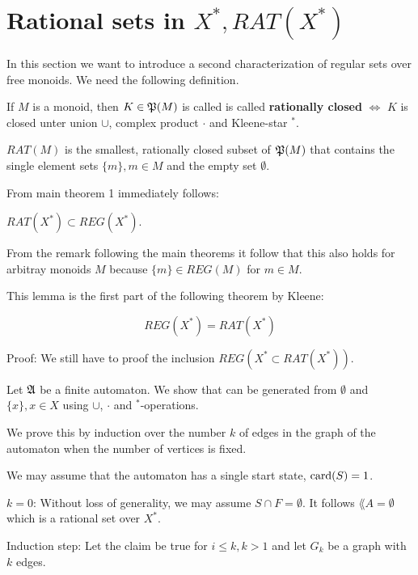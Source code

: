 \section{Rational sets in $X^*, RAT(X^*)$}

In this section we want to introduce a second characterization of regular sets
over free monoids. We need the following definition.

\begin{definition}
If $M$ is a monoid, then $K \in \mathfrak{P}(M)$ is called is called {\bf rationally
closed} $\Leftrightarrow$ $K$ is closed unter union $\cup$, complex product $\cdot$ and Kleene-star $^*$.
\end{definition}

\begin{definition}
$RAT(M)$ is the smallest, rationally closed subset of $\mathfrak{P}(M)$ that
contains the single element sets $\{m\}, m \in M$ and the empty set $\emptyset$.
\end{definition}

From main theorem 1 immediately follows:

\begin{lemma}
$RAT(X^*) \subset REG(X^*)$.
\end{lemma}

From the remark following the main theorems it follow that this also holds for
arbitray monoids $M$ because $\{m\} \in REG(M)$ for $m \in M$.

This lemma is the first part of the following theorem by Kleene:

\begin{theorem}[Kleene]
\[ REG(X^*) = RAT(X^*) \]
\end{theorem}

Proof: We still have to proof the inclusion $REG(X^* \subset RAT(X^*))$.

Let $\mbox{$\mathfrak{A}$}$ be a finite automaton. We show that  can be generated
from $\emptyset$ and $\{x\}, x \in X$	using $\cup$, $\cdot$ and $^*$-operations.

We prove this by induction over the number $k$ of edges in the graph of the
automaton when the number of vertices is fixed.

We may assume that the automaton has a single start state, $\mathrm{card}(S) = 1$.

$k = 0$: Without loss of generality, we may assume $S \cap F = \emptyset$. It
follows $\lang{A} = \emptyset$ which is a rational set over $X^*$.

Induction step: Let the claim be true for $i \leq k, k > 1$ and let $G_k$ be a
graph with $k$ edges.

